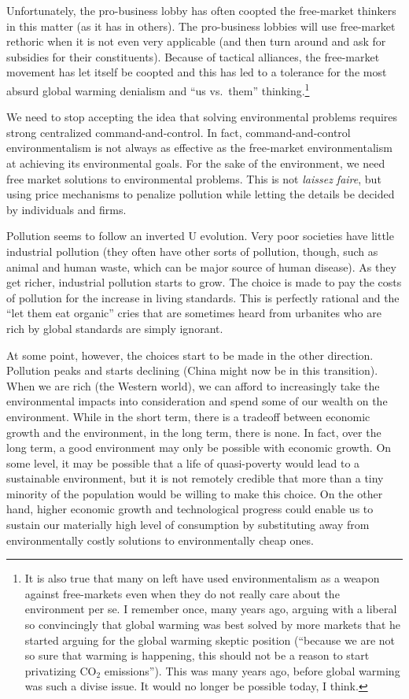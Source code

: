 Unfortunately, the pro-business lobby has often coopted the free-market
thinkers in this matter (as it has in others). The pro-business lobbies will
use free-market rethoric when it is not even very applicable (and then turn
around and ask for subsidies for their constituents). Because of tactical
alliances, the free-market movement has let itself be coopted and this has led
to a tolerance for the most absurd global warming denialism and ``us vs.\
them'' thinking.\footnote{It is also true that many on left have used
environmentalism as a weapon against free-markets even when they do not really
care about the environment per se. I remember once, many years ago, arguing
with a liberal so convincingly that global warming was best solved by more
markets that he started arguing for the global warming skeptic position
(``because we are not so sure that warming is happening, this should not be a
reason to start privatizing CO${}_2$ emissions''). This was many years ago,
before global warming was such a divise issue. It would no longer be possible
today, I think.}

We need to stop accepting the idea that solving environmental problems requires
strong centralized command-and-control. In fact, command-and-control
environmentalism is not always as effective as the free-market environmentalism
at achieving its environmental goals. For the sake of the environment, we need
free market solutions to environmental problems. This is not \emph{laissez
faire}, but using price mechanisms to penalize pollution while letting the
details be decided by individuals and firms.

Pollution seems to follow an inverted U evolution. Very poor societies have
little industrial pollution (they often have other sorts of pollution, though,
such as animal and human waste, which can be major source of human disease). As
they get richer, industrial pollution starts to grow. The choice is made to pay
the costs of pollution for the increase in living standards. This is perfectly
rational and the ``let them eat organic'' cries that are sometimes heard from
urbanites who are rich by global standards are simply ignorant.

At some point, however, the choices start to be made in the other direction.
Pollution peaks and starts declining (China might now be in this transition).
When we are rich (the Western world), we can afford to increasingly take the
environmental impacts into consideration and spend some of our wealth on the
environment.  While in the short term, there is a tradeoff between economic
growth and the environment, in the long term, there is none. In fact, over the
long term, a good environment may only be possible with economic growth. On
some level, it may be possible that a life of quasi-poverty would lead to a
sustainable environment, but it is not remotely credible that more than a tiny
minority of the population would be willing to make this choice. On the other
hand, higher economic growth and technological progress could enable us to
sustain our materially high level of consumption by substituting away from
environmentally costly solutions to environmentally cheap ones.

